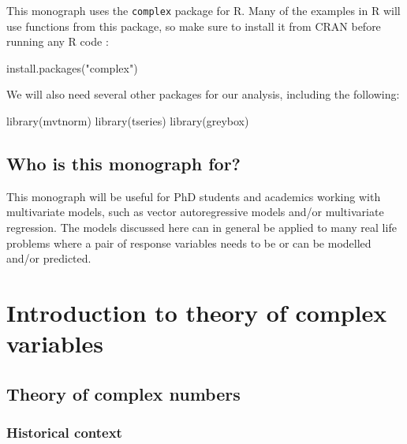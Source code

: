 \documentclass[
]{book}
\newenvironment{Shaded}{\begin{snugshade}}{\end{snugshade}}
\newcommand{\FunctionTok}[1]{\textcolor[rgb]{0.00,0.00,0.00}{#1}}
\newcommand{\NormalTok}[1]{#1}
\newcommand{\StringTok}[1]{\textcolor[rgb]{0.31,0.60,0.02}{#1}}
\begin{document}
This monograph uses the \texttt{complex} package for R. Many of the examples in R will use functions from this package, so make sure to install it from CRAN before running any R code \citep{R-complex}:

\begin{Shaded}
\begin{Highlighting}[]
\FunctionTok{install.packages}\NormalTok{(}\StringTok{"complex"}\NormalTok{)}
\end{Highlighting}
\end{Shaded}

We will also need several other packages for our analysis, including the following:

\begin{Shaded}
\begin{Highlighting}[]
\FunctionTok{library}\NormalTok{(mvtnorm)}
\FunctionTok{library}\NormalTok{(tseries)}
\FunctionTok{library}\NormalTok{(greybox)}
\end{Highlighting}
\end{Shaded}

\hypertarget{who-is-this-monograph-for}{%
\section*{Who is this monograph for?}\label{who-is-this-monograph-for}}

This monograph will be useful for PhD students and academics working with multivariate models, such as vector autoregressive models and/or multivariate regression. The models discussed here can in general be applied to many real life problems where a pair of response variables needs to be or can be modelled and/or predicted.

\hypertarget{intro}{%
\chapter{Introduction to theory of complex variables}\label{intro}}

\hypertarget{theoryOfComplexNumbers}{%
\section{Theory of complex numbers}\label{theoryOfComplexNumbers}}

\hypertarget{historical-context}{%
\subsection{Historical context}\label{historical-context}}
\end{document}

